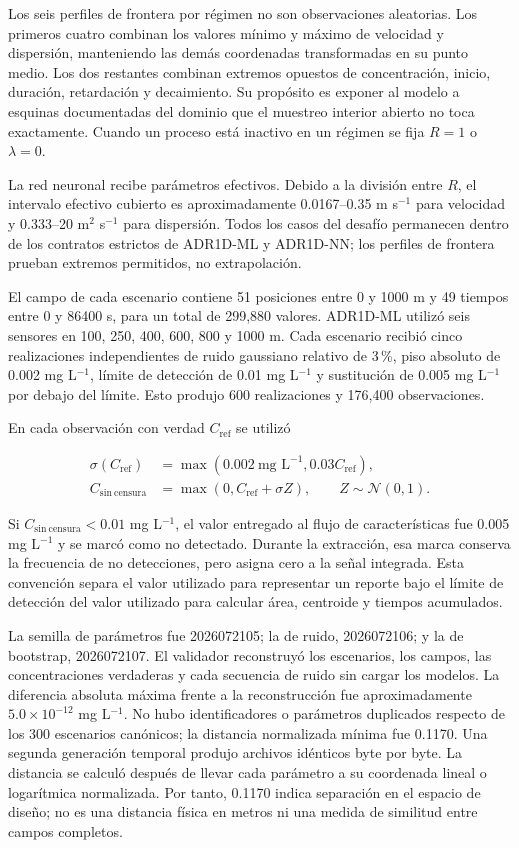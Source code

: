 \documentclass[11pt,a4paper]{article}
\begin{document}
Los seis perfiles de frontera por régimen no son observaciones aleatorias. Los
primeros cuatro combinan los valores mínimo y máximo de velocidad y dispersión,
manteniendo las demás coordenadas transformadas en su punto medio. Los dos
restantes combinan extremos opuestos de concentración, inicio, duración,
retardación y decaimiento. Su propósito es exponer al modelo a esquinas
documentadas del dominio que el muestreo interior abierto no toca exactamente.
Cuando un proceso está inactivo en un régimen se fija $R=1$ o $\lambda=0$.

La red neuronal recibe parámetros efectivos. Debido a la división entre $R$,
el intervalo efectivo cubierto es aproximadamente 0.0167--0.35 m s$^{-1}$ para
velocidad y 0.333--20 m$^2$ s$^{-1}$ para dispersión. Todos los casos del
desafío permanecen dentro de los contratos estrictos de ADR1D-ML y ADR1D-NN;
los perfiles de frontera prueban extremos permitidos, no extrapolación.

El campo de cada escenario contiene 51 posiciones entre 0 y 1000 m y 49
tiempos entre 0 y 86400 s, para un total de 299,880 valores. ADR1D-ML utilizó
seis sensores en 100, 250, 400, 600, 800 y 1000 m. Cada escenario recibió cinco
realizaciones independientes de ruido gaussiano relativo de 3\,\%, piso
absoluto de 0.002 mg L$^{-1}$, límite de detección de 0.01 mg L$^{-1}$ y
sustitución de 0.005 mg L$^{-1}$ por debajo del límite. Esto produjo 600
realizaciones y 176,400 observaciones.

En cada observación con verdad $C_{\mathrm{ref}}$ se utilizó

\begin{align}
\sigma(C_{\mathrm{ref}})&=\max\!\left(0.002\ \text{mg L}^{-1},
0.03C_{\mathrm{ref}}\right),\\
C_{\mathrm{sin\ censura}}&=\max\!\left(0,
C_{\mathrm{ref}}+\sigma Z\right),\qquad Z\sim\mathcal N(0,1).
\label{eq:sensor-noise}
\end{align}

Si $C_{\mathrm{sin\ censura}}<0.01$ mg L$^{-1}$, el valor entregado al flujo de
características fue 0.005 mg L$^{-1}$ y se marcó como no detectado. Durante la
extracción, esa marca conserva la frecuencia de no detecciones, pero asigna
cero a la señal integrada. Esta convención separa el valor utilizado para
representar un reporte bajo el límite de detección del valor utilizado para
calcular área, centroide y tiempos acumulados.

La semilla de parámetros fue 2026072105; la de ruido, 2026072106; y la de
bootstrap, 2026072107. El validador reconstruyó los escenarios, los campos, las
concentraciones verdaderas y cada secuencia de ruido sin cargar los modelos. La
diferencia absoluta máxima frente a la reconstrucción fue aproximadamente
$5.0\times10^{-12}$ mg L$^{-1}$. No hubo identificadores o parámetros
duplicados respecto de los 300 escenarios canónicos; la distancia normalizada
mínima fue 0.1170. Una segunda generación temporal produjo archivos idénticos
byte por byte. La distancia se calculó después de llevar cada parámetro a su
coordenada lineal o logarítmica normalizada. Por tanto, 0.1170 indica separación
en el espacio de diseño; no es una distancia física en metros ni una medida de
similitud entre campos completos.
\end{document}
